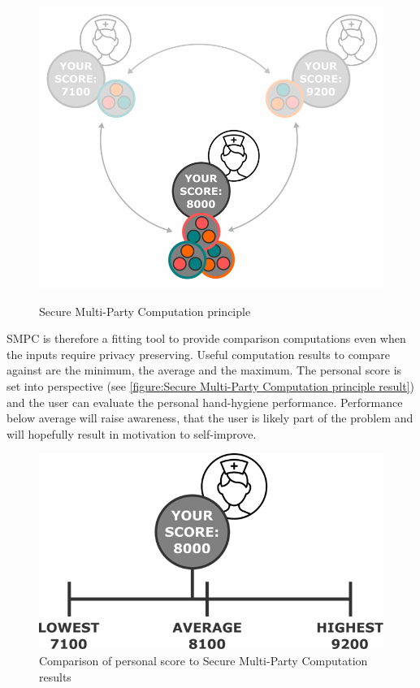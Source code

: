 \begin{figure}[!htb]
{		\includegraphics[scale=1.0]{figures/smpc_principle_e.png}
		\label{figure:Secure Multi-Party Computation principle - e}
	}%
	\hfill

	\caption{Secure Multi-Party Computation principle} \label{figure:Secure Multi-Party Computation principle}
\end{figure}

\gls{SMPC} is therefore a fitting tool to provide comparison computations even when the inputs require privacy preserving. Useful computation results to compare against are the minimum, the average and the maximum. The personal score is set into perspective (see \autoref{figure:Secure Multi-Party Computation principle result}) and the user can evaluate the personal hand-hygiene performance. Performance below average will raise awareness, that the user is likely part of the problem and will hopefully result in motivation to self-improve.

\begin{figure}[!htb] %
	\caption[Comparison of SMPC result and personal score]{Comparison of personal score to Secure Multi-Party Computation results} \label{figure:Secure Multi-Party Computation principle result}
	\includegraphics[scale=1.0]{figures/smpc_principle_result.png}
\end{figure}

